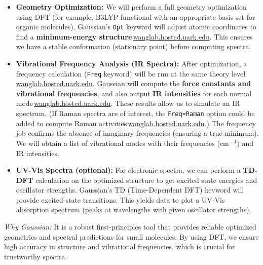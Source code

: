 \documentclass[11pt]{article}
\begin{document}
\begin{itemize}
  \item \textbf{Geometry Optimization:} We will perform a full geometry optimization using DFT (for example, B3LYP functional with an appropriate basis set for organic molecules). Gaussian’s \texttt{Opt} keyword will adjust atomic coordinates to find a \textbf{minimum-energy structure}\,\href{https://wanglab.hosted.uark.edu/g98help/00000437.htm\#:\~:text=frequencies\%20for\%20a\%20correlated\%20method,route\%20section\%20for\%20a\%20job}{wanglab.hosted.uark.edu}. This ensures we have a stable conformation (stationary point) before computing spectra.
  \item \textbf{Vibrational Frequency Analysis (IR Spectra):} After optimization, a frequency calculation (\texttt{Freq} keyword) will be run at the same theory level\,\href{https://wanglab.hosted.uark.edu/g98help/00000437.htm\#:\~:text=frequencies\%20for\%20a\%20correlated\%20method,route\%20section\%20for\%20a\%20job}{wanglab.hosted.uark.edu}. Gaussian will compute the \textbf{force constants and vibrational frequencies}, and also output \textbf{IR intensities} for each normal mode\,\href{https://wanglab.hosted.uark.edu/g98help/00000437.htm\#:\~:text=This\%20calculation\%20type\%20keyword\%20computes,required\%2C\%20polarizabilities\%20must\%20be\%20explicitly}{wanglab.hosted.uark.edu}. These results allow us to simulate an IR spectrum. (If Raman spectra are of interest, the \texttt{Freq=Raman} option could be added to compute Raman activities\,\href{https://wanglab.hosted.uark.edu/g98help/00000437.htm\#:\~:text=Raman\%20Compute\%20Raman\%20intensities\%20in,Raman\%20intensities\%20by\%20numerical\%20integration}{wanglab.hosted.uark.edu}.) The frequency job confirms the absence of imaginary frequencies (ensuring a true minimum). We will obtain a list of vibrational modes with their frequencies (cm\,$^{-1}$) and IR intensities.
  \item \textbf{UV-Vis Spectra (optional):} For electronic spectra, we can perform a \textbf{TD-DFT} calculation on the optimized structure to get excited state energies and oscillator strengths. Gaussian’s TD (Time-Dependent DFT) keyword will provide excited-state transitions. This yields data to plot a UV-Vis absorption spectrum (peaks at wavelengths with given oscillator strengths).
\end{itemize}

\emph{Why Gaussian:} It is a robust first-principles tool that provides reliable optimized geometries and spectral predictions for small molecules. By using DFT, we ensure high accuracy in structure and vibrational frequencies, which is crucial for trustworthy spectra.
\end{document}
